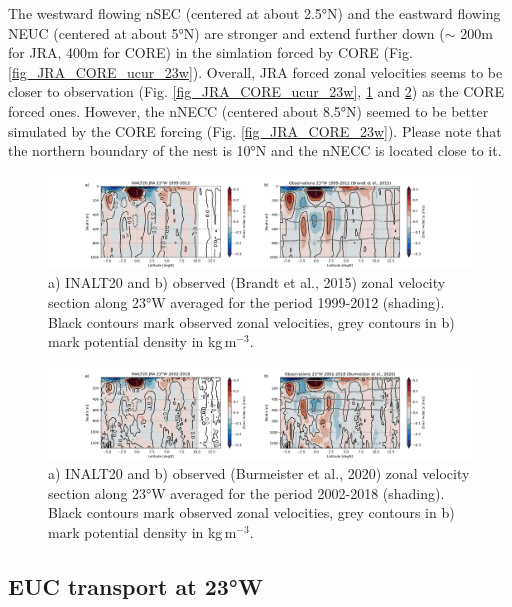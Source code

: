 \documentclass[a4paperpaper,]{article}
\begin{document}
The westward flowing nSEC (centered at about 2.5°N) and the eastward
flowing NEUC (centered at about 5°N) are stronger and extend further
down (\(\sim\) 200m for JRA, 400m for CORE) in the simlation forced by
CORE (Fig. \ref{fig_JRA_CORE_ucur_23w}). Overall, JRA forced zonal
velocities seems to be closer to observation (Fig.
\ref{fig_JRA_CORE_ucur_23w}, \ref{fig_JRA_obs_brandt_23w} and
\ref{fig_JRA_obs_burmeister_23w}) as the CORE forced ones. However, the
nNECC (centered about 8.5°N) seemed to be better simulated by the CORE
forcing (Fig. \ref{fig_JRA_CORE_23w}). Please note that the northern
boundary of the nest is 10°N and the nNECC is located close to it.

\begin{figure}
\centering
\includegraphics[width=1.50000\textwidth]{./figures/INALT20_obs_23w_comparison/1_INALT20_obs_23w_1999_2012.png}
\caption{a) INALT20 and b) observed (Brandt et al., 2015) zonal velocity
section along 23°W averaged for the period 1999-2012 (shading). Black
contours mark observed zonal velocities, grey contours in b) mark
potential density in kg\(\,\)m\(^{-3}\). \label{fig_JRA_obs_brandt_23w}}
\end{figure}

\begin{figure}
\centering
\includegraphics[width=1.50000\textwidth]{./figures/INALT20_obs_23w_comparison/1_INALT20_obs_23w_2002_2018.png}
\caption{a) INALT20 and b) observed (Burmeister et al., 2020) zonal
velocity section along 23°W averaged for the period 2002-2018 (shading).
Black contours mark observed zonal velocities, grey contours in b) mark
potential density in kg\(\,\)m\(^{-3}\).
\label{fig_JRA_obs_burmeister_23w}}
\end{figure}

\subsection{EUC transport at 23°W}\label{euc-transport-at-23w}
\end{document}
